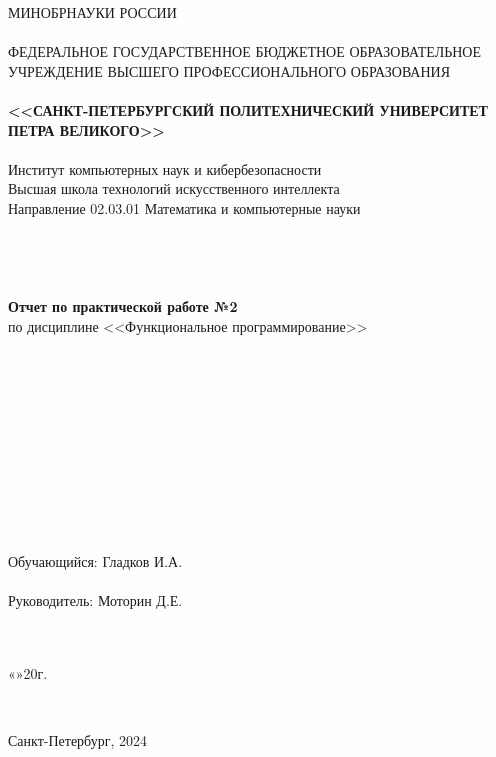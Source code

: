 \documentclass[10pt,a4paper,final]{article} %
\begin{document}
\thispagestyle{empty}

\begin{center}
	{\Large МИНОБРНАУКИ РОССИИ}\\
	~\\
	{\large ФЕДЕРАЛЬНОЕ ГОСУДАРСТВЕННОЕ БЮДЖЕТНОЕ ОБРАЗОВАТЕЛЬНОЕ УЧРЕЖДЕНИЕ ВЫСШЕГО ПРОФЕССИОНАЛЬНОГО ОБРАЗОВАНИЯ}\\
	~\\
	{\Large \bf <<САНКТ-ПЕТЕРБУРГСКИЙ ПОЛИТЕХНИЧЕСКИЙ УНИВЕРСИТЕТ ПЕТРА ВЕЛИКОГО>>}\\
	~\\
	{\large Институт компьютерных наук и кибербезопасности}\\
	{\large Высшая школа технологий искусственного интеллекта}\\
	{\large Направление 02.03.01 Математика и компьютерные науки}\\
	~\\
	~\\
	~\\
	~\\
	{\Large \bf Отчет по практической работе №2}\\
	{\Large по дисциплине <<Функциональное программирование>> }\\
	~\\
	~\\
	
	
	~\\
	~\\
	~\\
	~\\
	~\\
	~\\
	~\\
	~\\
	~\\
	{\large Обучающийся: \underline{\hspace{3.5cm}} \qquad\qquad Гладков И.А.}\\
	~\\
	{\large Руководитель: \underline{\hspace{3.5cm}} \hspace{15mm} Моторин Д.Е.}\\
	~\\
	~\\
\end{center}
\begin{flushright}
	
	«\underline{\hspace{1cm}}»\underline{\hspace{3cm}}20\underline{\hspace{0.7cm}}г.
\end{flushright}
~\\
\begin{center}
	{\large Санкт-Петербург, 2024}
\end{center}
\newpage
\end{document}
